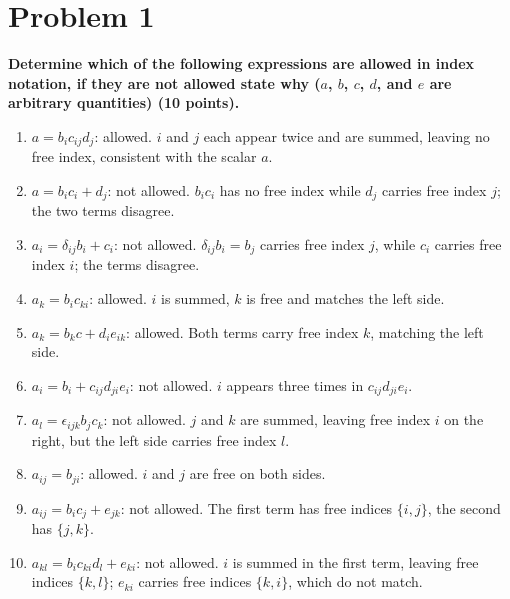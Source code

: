 \documentclass[12pt]{article}
\begin{document}
\section*{Problem 1}
\textbf{Determine which of the following expressions are allowed in index notation, if they are not allowed state why ($a$, $b$, $c$, $d$, and $e$ are arbitrary quantities) (10 points).}

\begin{enumerate}[label=(\alph*)]
    \item $a = b_ic_{ij}d_j$: allowed. $i$ and $j$ each appear twice and are summed, leaving no free index, consistent with the scalar $a$.

    \item $a = b_ic_i + d_j$: not allowed. $b_ic_i$ has no free index while $d_j$ carries free index $j$; the two terms disagree.

    \item $a_i = \delta_{ij}b_i + c_i$: not allowed. $\delta_{ij}b_i = b_j$ carries free index $j$, while $c_i$ carries free index $i$; the terms disagree.

    \item $a_k = b_ic_{ki}$: allowed. $i$ is summed, $k$ is free and matches the left side.

    \item $a_k = b_kc + d_ie_{ik}$: allowed. Both terms carry free index $k$, matching the left side.

    \item $a_i = b_i + c_{ij}d_{ji}e_i$: not allowed. $i$ appears three times in $c_{ij}d_{ji}e_i$.

    \item $a_l = \epsilon_{ijk}b_jc_k$: not allowed. $j$ and $k$ are summed, leaving free index $i$ on the right, but the left side carries free index $l$.

    \item $a_{ij} = b_{ji}$: allowed. $i$ and $j$ are free on both sides.

    \item $a_{ij} = b_ic_j + e_{jk}$: not allowed. The first term has free indices $\{i,j\}$, the second has $\{j,k\}$.

    \item $a_{kl} = b_ic_{ki}d_l + e_{ki}$: not allowed. $i$ is summed in the first term, leaving free indices $\{k,l\}$; $e_{ki}$ carries free indices $\{k,i\}$, which do not match.
\end{enumerate}
\end{document}

